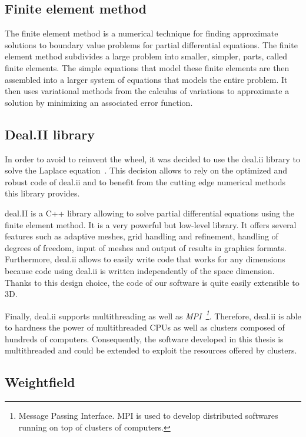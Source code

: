 \documentclass[11pt]{article}
\begin{document}
	\subsection{Finite element method}

		The finite element method is a numerical technique for
		finding approximate solutions to boundary value problems for partial
		differential equations. The finite element method subdivides a large
		problem into smaller, simpler, parts, called finite elements. The
		simple equations that model these finite elements are then assembled
		into a larger system of equations that models the entire problem. It
		then uses variational methods from the calculus of variations to
		approximate a solution by minimizing an associated error function.

	\subsection{Deal.II library}

	In order to avoid to reinvent the wheel, it was decided to use the deal.ii library
	to solve the Laplace equation~\cite{Bangerth:2007:DGO:1268776.1268779}. This decision allows to rely on the optimized
	and robust code of deal.ii and to benefit from the cutting edge numerical methods this library provides.

	deal.II is a C++ library allowing to solve partial differential equations
	using the finite element method. It is a very powerful but low-level library.
	It offers several features such as adaptive meshes, grid handling
and refinement, handling of degrees of freedom, input of meshes and output of results in
graphics formats. Furthermore, deal.ii allows to easily write code that works
for any dimensions because code using deal.ii is written independently of the space
dimension. Thanks to this design choice, the code of our software is quite easily
extensible to 3D.

Finally, deal.ii supports multithreading as well as \textit{MPI~\footnote{Message
Passing Interface. MPI is used to develop distributed softwares running on top of
clusters of computers.}}. Therefore,
deal.ii is able to hardness the power of multithreaded CPUs as well as
clusters composed of hundreds of computers. Consequently,
the software developed in this thesis is multithreaded and could be extended to
exploit the resources offered by clusters.


	\subsection{Weightfield}
\end{document}
